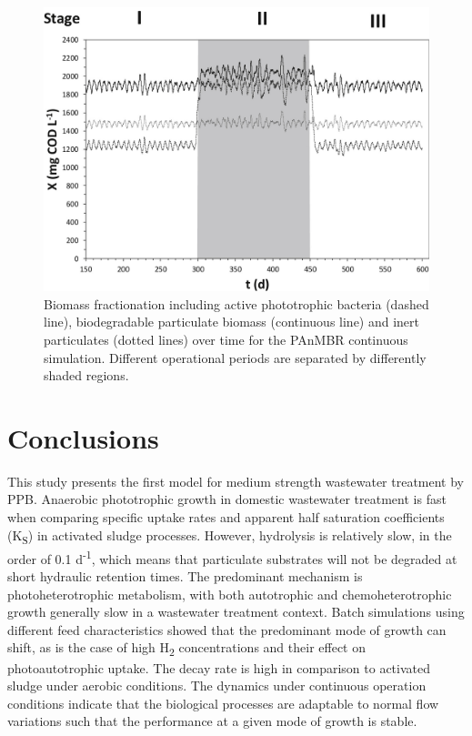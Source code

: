 \begin{figure}[tp]
    \centering
    \includegraphics[width=1\linewidth,height=\textheight,keepaspectratio]{./Chap2/simulations/dynamic_biomass.jpg}
    \caption{Biomass fractionation including active phototrophic bacteria (dashed line), biodegradable particulate biomass (continuous line) and inert particulates (dotted lines) over time for the PAnMBR continuous simulation. Different operational periods are separated by differently shaded regions.}
    \label{fig:ch2_dyn_bio}
\end{figure}

\section{Conclusions}
This study presents the first model for medium strength wastewater treatment by PPB.
Anaerobic phototrophic growth in domestic wastewater treatment is fast when comparing specific uptake rates and apparent half saturation coefficients (K\textsubscript{S}) in activated sludge processes. However, hydrolysis is relatively slow, in the order of 0.1 d\textsuperscript{-1}, which means that particulate substrates will not be degraded at short hydraulic retention times. The predominant mechanism is photoheterotrophic metabolism, with both autotrophic and chemoheterotrophic growth generally slow in a wastewater treatment context. Batch simulations using different feed characteristics showed that the predominant mode of growth can shift, as is the case of high H\textsubscript{2} concentrations and their effect on photoautotrophic uptake. The decay rate is high in comparison to activated sludge under aerobic conditions. The dynamics under continuous operation conditions indicate that the biological processes are adaptable to normal flow variations such that the performance at a given mode of growth is stable. 

